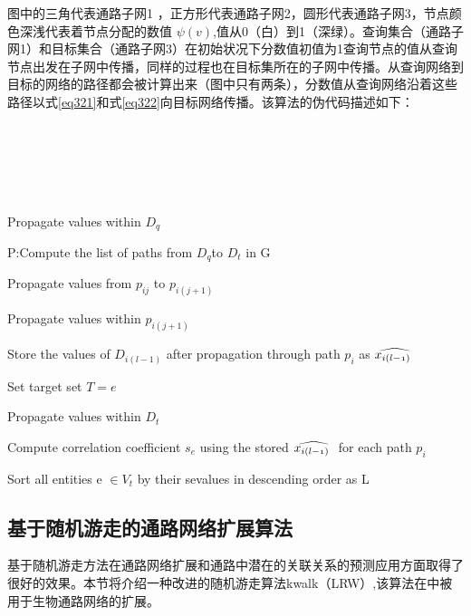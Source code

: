 图中的三角代表通路子网1 ，正方形代表通路子网2，圆形代表通路子网3，节点颜色深浅代表着节点分配的数值 $\psi (v)$,值从0（白）到1（深绿）。查询集合（通路子网1）和目标集合（通路子网3）在初始状况下分数值初值为1查询节点的值从查询节点出发在子网中传播，同样的过程也在目标集所在的子网中传播。从查询网络到目标的网络的路径都会被计算出来（图中只有两条），分数值从查询网络沿着这些路径以式\ref{eq321}和式\ref{eq322}向目标网络传播。该算法的伪代码描述如下：
\\
\\
\\
\\
\\
\\



\begin{algorithm}
%

Propagate values within $D_{q}$

P:Compute the list of paths from $D_{q}$to $D_{t}$ in G

{
	{
		Propagate values from $p_{ij}$ to $p_{i(j+1)}$
		
		Propagate values within $p_{i(j+1)}$
    }

    Store the values of $D_{i(l−1)}$ after propagation through path $p_{i}$ as $\mathnormal{\widehat{x_{i( l-1)} \ }}$
 }

{
	Set target set $T = {e}$

	Propagate values within $D_{t}$

	Compute correlation coefficient $s_{e}$ using the stored $ \mathnormal{\widehat{x_{i( l-1)} \ }}$ for each path $p_{i}$
}

Sort all entities e $\in V_{t}$ by their sevalues in descending order as L

\end{algorithm}
\subsection{基于随机游走的通路网络扩展算法}
基于随机游走方法在通路网络扩展和通路中潜在的关联关系的预测应用方面取得了很好的效果。本节将介绍一种改进的随机游走算法kwalk\cite{zhang2016limited}（LRW）,该算法在\cite{zhang2016network}中被用于生物通路网络的扩展。

